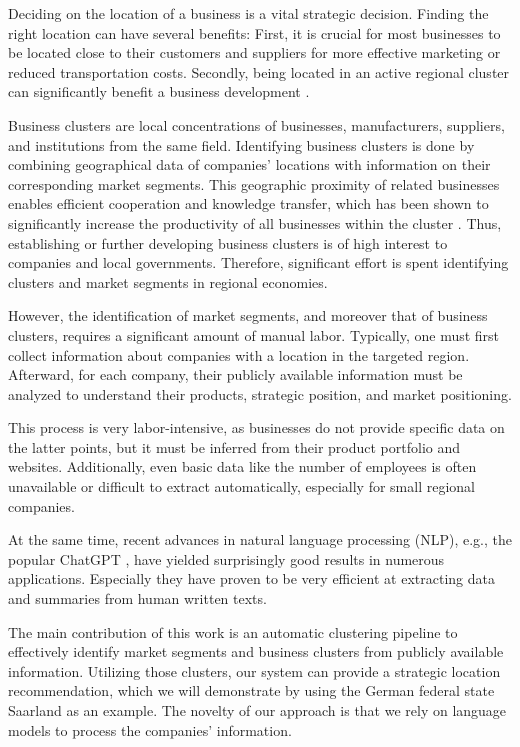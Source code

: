 \documentclass[conference]{IEEEtran}
\begin{document}
Deciding on the location of a business is a vital strategic decision. Finding the right location can have several benefits: First, it is crucial for most businesses to be located close to their customers and suppliers for more effective marketing or reduced transportation costs. Secondly, being located in an active regional cluster can significantly benefit a business development \cite{clustersandcomp,gems-model, regionaladv, clustertheory}. 

Business clusters are local concentrations of businesses, manufacturers, suppliers, and institutions from the same field. Identifying business clusters is done by combining geographical data of companies' locations with information on their corresponding market segments. This geographic proximity of related businesses enables efficient cooperation and knowledge transfer, which has been shown to significantly increase the productivity of all businesses within the cluster \cite{clustersandcomp,gems-model, regionaladv, clustertheory}. Thus, establishing or further developing business clusters is of high interest to companies and local governments. Therefore, significant effort is spent identifying clusters and market segments in regional economies. 

However, the identification of market segments, and moreover that of business clusters, requires a significant amount of manual labor. Typically, one must first collect information about companies with a location in the targeted region. Afterward, for each company, their publicly available information must be analyzed to understand their products, strategic position, and market positioning. 

This process is very labor-intensive, as businesses do not provide specific data on the latter points, but it must be inferred from their product portfolio and websites. Additionally, even basic data like the number of employees is often unavailable or difficult to extract automatically, especially for small regional companies.

At the same time, recent advances in natural language processing (NLP), e.g., the popular ChatGPT \cite{chatgpt}, have yielded surprisingly good results in numerous applications. Especially they have proven to be very efficient at extracting data and summaries from human written texts.

The main contribution of this work is an automatic clustering pipeline to effectively identify market segments and business clusters from publicly available information. Utilizing those clusters, our system can provide a strategic location recommendation, which we will demonstrate by using the German federal state Saarland as an example. The novelty of our approach is that we rely on language models to process the companies' information. 
\end{document}
